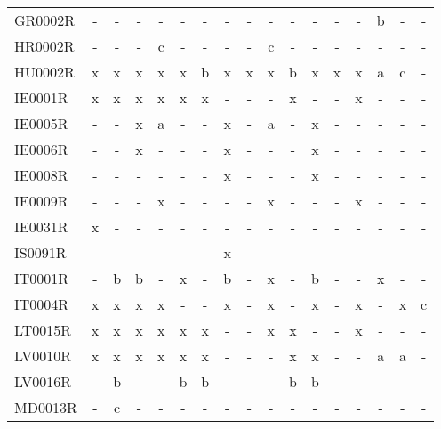 \begin{table}
{{\begin{tabular}{l|cccccccccccccccc}
        GR0002R &  - &   - &    - &      - &   - &    - &    - &    - &      - &    - &    - &   - &      - &    b &    - &     - \\
        HR0002R &  - &   - &    - &      c &   - &    - &    - &    - &      c &    - &    - &   - &      - &    - &    - &     - \\
        HU0002R &  x &   x &    x &      x &   x &    b &    x &    x &      x &    b &    x &   x &      x &    a &    c &     - \\
        IE0001R &  x &   x &    x &      x &   x &    x &    - &    - &      - &    x &    - &   - &      x &    - &    - &     - \\
        IE0005R &  - &   - &    x &      a &   - &    - &    x &    - &      a &    - &    x &   - &      - &    - &    - &     - \\
        IE0006R &  - &   - &    x &      - &   - &    - &    x &    - &      - &    - &    x &   - &      - &    - &    - &     - \\
        IE0008R &  - &   - &    - &      - &   - &    - &    x &    - &      - &    - &    x &   - &      - &    - &    - &     - \\
        IE0009R &  - &   - &    - &      x &   - &    - &    - &    - &      x &    - &    - &   - &      x &    - &    - &     - \\
        IE0031R &  x &   - &    - &      - &   - &    - &    - &    - &      - &    - &    - &   - &      - &    - &    - &     - \\
        IS0091R &  - &   - &    - &      - &   - &    - &    x &    - &      - &    - &    - &   - &      - &    - &    - &     - \\
        IT0001R &  - &   b &    b &      - &   x &    - &    b &    - &      x &    - &    b &   - &      - &    x &    - &     - \\
        IT0004R &  x &   x &    x &      x &   - &    - &    x &    - &      x &    - &    x &   - &      x &    - &    x &     c \\
        LT0015R &  x &   x &    x &      x &   x &    x &    - &    - &      x &    x &    - &   - &      x &    - &    - &     - \\
        LV0010R &  x &   x &    x &      x &   x &    x &    - &    - &      - &    x &    x &   - &      - &    a &    a &     - \\
        LV0016R &  - &   b &    - &      - &   b &    b &    - &    - &      - &    b &    b &   - &      - &    - &    - &     - \\
        MD0013R &  - &   c &    - &      - &   - &    - &    - &    - &      - &    - &    - &   - &      - &    - &    - &     - \\

\end{tabular}}}
\end{table}
